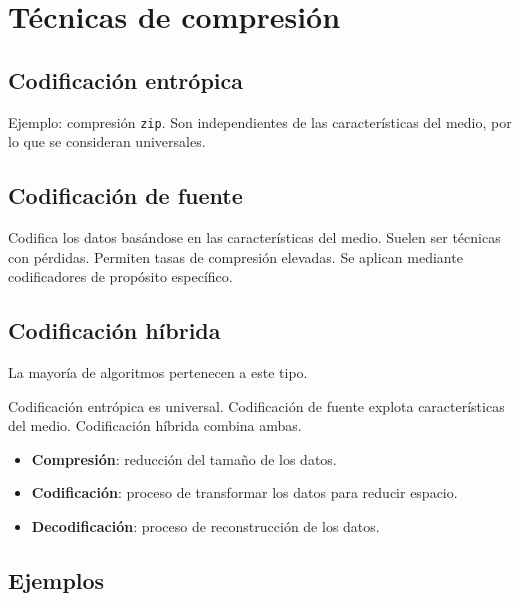 \documentclass[11pt,a4paper]{article}
\begin{document}
\section{Técnicas de compresión}

\subsection{Codificación entrópica}
Ejemplo: compresión \texttt{zip}.
Son independientes de las características del medio, por lo que se consideran universales.

\subsection{Codificación de fuente}
Codifica los datos basándose en las características del medio.
Suelen ser técnicas con pérdidas.
Permiten tasas de compresión elevadas.
Se aplican mediante codificadores de propósito específico.

\subsection{Codificación híbrida}
La mayoría de algoritmos pertenecen a este tipo.

\begin{ResumenBox}
Codificación entrópica es universal.
Codificación de fuente explota características del medio.
Codificación híbrida combina ambas.
\end{ResumenBox}

\begin{VocabBox}
\begin{itemize}
	\item \textbf{Compresión}: reducción del tamaño de los datos.
	\item \textbf{Codificación}: proceso de transformar los datos para reducir espacio.
	\item \textbf{Decodificación}: proceso de reconstrucción de los datos.
\end{itemize}
\end{VocabBox}

\subsection{Ejemplos}
\end{document}
